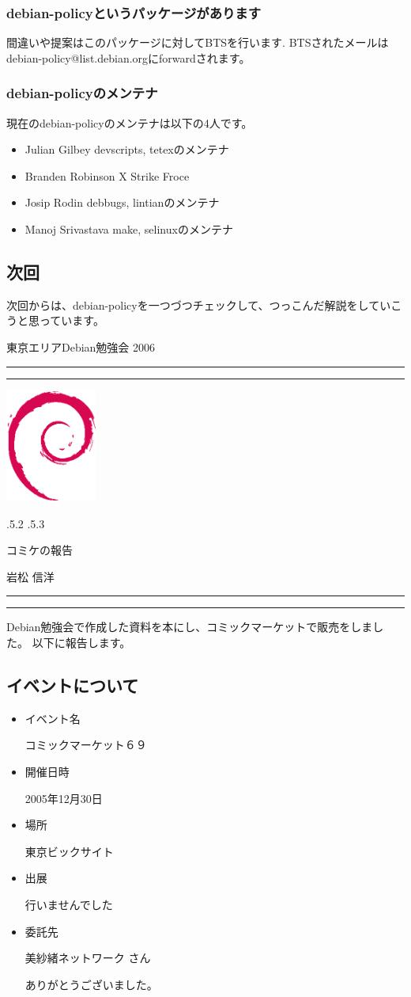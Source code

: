 \documentclass[mingoth,a4paper]{jsarticle}
\makeatletter
\renewcommand{\section}{\@startsection{section}{1}{\z@}%
    {\Cvs \@plus.5\Cdp \@minus.2\Cdp}%
    {.5\Cvs \@plus.3\Cdp}%
    {\normalfont\Large\headfont\raggedright\centering}} %
\newcommand{\dancersection}[2]{%
\newpage
東京エリアDebian勉強会 2006
\hrule
\vspace{0.5mm}
\hrule
\hfill{}\includegraphics[width=3cm]{image200502/openlogo-nd.eps}\\
\vspace{-4cm}
\begin{center}
  \section{#1}
\end{center}
\hfill{}#2\hspace{3cm}\space\\
\hrule
\hrule
\vspace{1cm}
}
\makeatother
\begin{document}
    \subsubsection{debian-policyというパッケージがあります}
        間違いや提案はこのパッケージに対してBTSを行います.
        BTSされたメールはdebian-policy@list.debian.orgにforwardされます。

    \subsubsection{debian-policyのメンテナ}
        現在のdebian-policyのメンテナは以下の4人です。

    \begin{itemize}
        \item Julian Gilbey
            devscripts, tetexのメンテナ
        \item Branden Robinson
            X Strike Froce
        \item Josip Rodin
            debbugs, lintianのメンテナ
        \item Manoj Srivastava
            make, selinuxのメンテナ
    \end{itemize}

\subsection{次回}
	次回からは、debian-policyを一つづつチェックして、つっこんだ解説をしていこうと思っています。


\dancersection{コミケの報告}{岩松 信洋}

Debian勉強会で作成した資料を本にし、コミックマーケットで販売をしました。
以下に報告します。

\subsection{イベントについて}
\begin{itemize}
 \item イベント名

	コミックマーケット６９
 \item 開催日時

	2005年12月30日
 \item 場所

	東京ビックサイト
 \item 出展

	行いませんでした
 \item 委託先

	美紗緒ネットワーク さん

	ありがとうございました。
\end{itemize}
\end{document}
